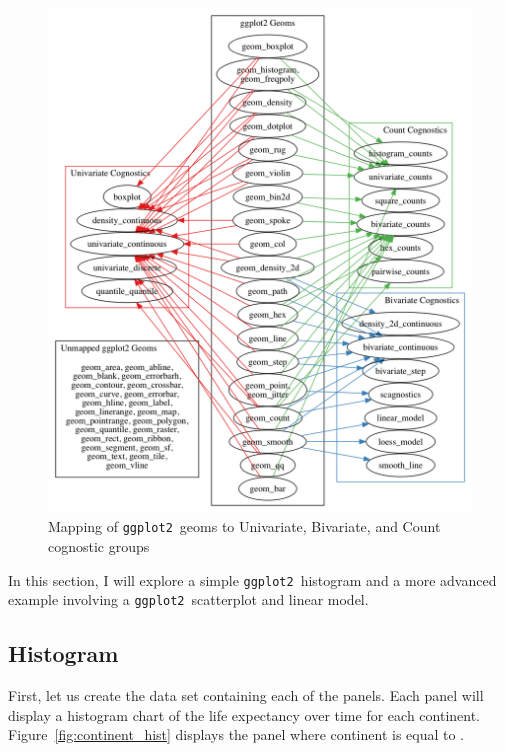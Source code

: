\documentclass[stat,dissertation]{puthesis}\usepackage[]{graphicx}\usepackage{xcolor}
\newcommand{\pkg}[1]{\texttt{#1}}
\newcommand{\ggplot}{\pkg{ggplot2}}
\begin{document}
\begin{figure}
  \label{fig:geom_mapping}
  \includegraphics[width=\textwidth]{./dot/ggplot_cognostics.png}
  \caption{Mapping of \ggplot~geoms to Univariate, Bivariate, and Count cognostic groups}
\end{figure}




In this section, I will explore a simple \ggplot~histogram and a more advanced example involving a \ggplot~scatterplot and linear model.

\subsection{Histogram}

First, let us create the data set containing each of the panels.  Each panel will display a histogram chart of the life expectancy over time for each continent. Figure~\ref{fig:continent_hist} displays the panel where continent is equal to .
\end{document}
